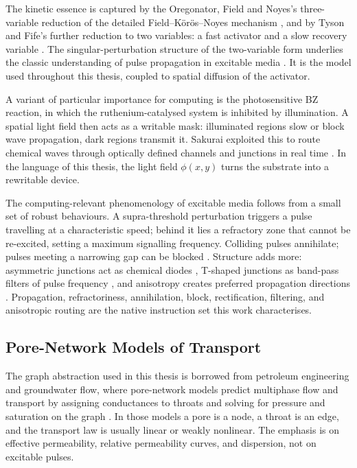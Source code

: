 The kinetic essence is captured by the Oregonator, Field and Noyes's three-variable reduction of the detailed Field--K\"or\"os--Noyes mechanism \cite{field1974oregonator}, and by Tyson and Fife's further reduction to two variables: a fast activator and a slow recovery variable \cite{tyson1980target}.
The singular-perturbation structure of the two-variable form underlies the classic understanding of pulse propagation in excitable media \cite{tyson1988singular}.
It is the model used throughout this thesis, coupled to spatial diffusion of the activator.

A variant of particular importance for computing is the photosensitive BZ reaction, in which the ruthenium-catalysed system is inhibited by illumination.
A spatial light field then acts as a writable mask: illuminated regions slow or block wave propagation, dark regions transmit it.
Sakurai \etal exploited this to route chemical waves through optically defined channels and junctions in real time \cite{sakurai2002design}.
In the language of this thesis, the light field $\phi(x,y)$ turns the substrate into a rewritable device.

The computing-relevant phenomenology of excitable media follows from a small set of robust behaviours.
A supra-threshold perturbation triggers a pulse travelling at a characteristic speed; behind it lies a refractory zone that cannot be re-excited, setting a maximum signalling frequency.
Colliding pulses annihilate; pulses meeting a narrowing gap can be blocked \cite{courtemanche1993instabilities}.
Structure adds more: asymmetric junctions act as chemical diodes \cite{agladze1996chemical}, T-shaped junctions as band-pass filters of pulse frequency \cite{gorecka2003tshaped}, and anisotropy creates preferred propagation directions \cite{steinbock1995anisotropy}.
Propagation, refractoriness, annihilation, block, rectification, filtering, and anisotropic routing are the native instruction set this work characterises.

\subsection{Pore-Network Models of Transport}
\label{subsec:lit_pore_networks}

The graph abstraction used in this thesis is borrowed from petroleum engineering and groundwater flow, where pore-network models predict multiphase flow and transport by assigning conductances to throats and solving for pressure and saturation on the graph \cite{xiong2016review, blunt2017multiphase}.
In those models a pore is a node, a throat is an edge, and the transport law is usually linear or weakly nonlinear.
The emphasis is on effective permeability, relative permeability curves, and dispersion, not on excitable pulses.

